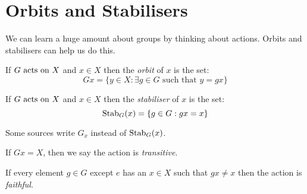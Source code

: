 \documentclass[../main.tex]{subfiles}
\begin{document}
\section{Orbits and Stabilisers}
We can learn a huge amount about groups by thinking about actions.
Orbits and stabilisers can help us do this.
\begin{definition}[Orbit]
  If $G \text{ acts on } X$ and $x \in X$ then the \textit{orbit} of $x$ is the set:
  \[
    Gx = \{y \in X : \exists g \in G \text{ such that } y = gx\}
  \]
\end{definition}
\begin{definition}[Stabiliser]
  If $G \text{ acts on } X$ and $x \in X$ then the \textit{stabiliser} of $x$ is the set:
  \[
    \operatorname{Stab}_G(x) = \{g \in G : gx = x\}
  \]
\end{definition}
\begin{remark}[Warning]
  Some sources write $G_x$ instead of $\operatorname{Stab}_G(x)$.
\end{remark}
\begin{definition}[Transitive]
  If $Gx = X$, then we say the action is \textit{transitive}.
\end{definition}
\begin{definition}[Faithful]
  If every element $g \in G$ except $e$ has an $x \in X$ such that $gx \neq x$ then the action is \textit{faithful}.
\end{definition}
\end{document}
